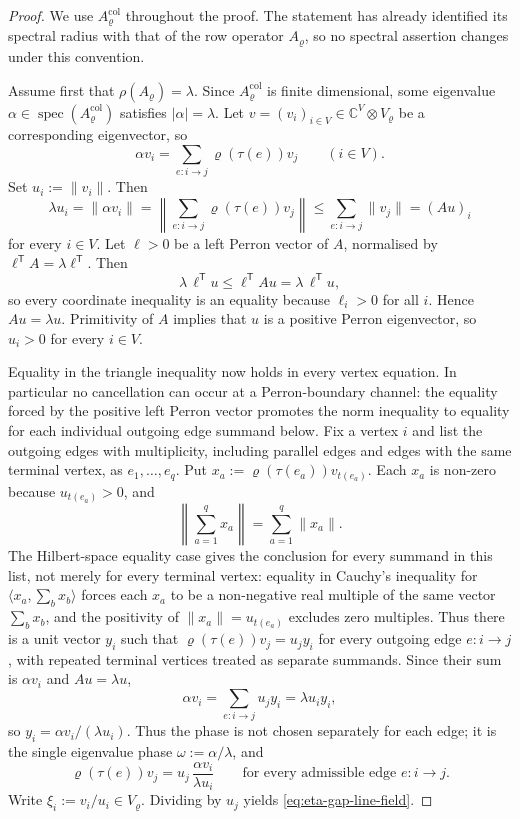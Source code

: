 \documentclass[11pt,a4paper]{amsart}
\theoremstyle{plain}
\theoremstyle{definition}
\theoremstyle{remark}
\DeclareMathOperator{\spec}{spec}
\newcommand{\CC}{\mathbb{C}}
\newcommand{\norm}[1]{\lVert #1 \rVert}
\begin{document}
\begin{proof}
  We use \(A_\varrho^{\mathrm{col}}\) throughout the proof. The statement
  has already identified its spectral radius with that of the row
  operator \(A_\varrho\), so no spectral assertion changes under this
  convention.

  Assume first that \(\rho(A_\varrho)=\lambda\). Since
  \(A_\varrho^{\mathrm{col}}\) is finite dimensional, some eigenvalue
  \(\alpha\in\spec(A_\varrho^{\mathrm{col}})\) satisfies
  \(|\alpha|=\lambda\). Let
  \(v=(v_i)_{i\in V}\in \CC^V\otimes V_\varrho\) be a corresponding
  eigenvector, so
  \[
    \alpha v_i=\sum_{e:i\to j}\varrho(\tau(e))v_j
    \qquad (i\in V).
  \]
  Set \(u_i:=\norm{v_i}\). Then
  \[
    \lambda u_i
    =
    \norm{\alpha v_i}
    =
    \left\|\sum_{e:i\to j}\varrho(\tau(e))v_j\right\|
    \le
    \sum_{e:i\to j}\norm{v_j}
    =(Au)_i
  \]
  for every \(i\in V\). Let \(\ell>0\) be a left Perron vector of
  \(A\), normalised by \(\ell^{\mathsf T}A=\lambda\ell^{\mathsf T}\).
  Then
  \[
    \lambda\,\ell^{\mathsf T}u
    \le
    \ell^{\mathsf T}Au
    =
    \lambda\,\ell^{\mathsf T}u,
  \]
  so every coordinate inequality is an equality because \(\ell_i>0\)
  for all \(i\). Hence \(Au=\lambda u\). Primitivity of \(A\) implies
  that \(u\) is a positive Perron eigenvector, so \(u_i>0\) for every
  \(i\in V\).

  Equality in the triangle inequality now holds in every vertex equation.
  In particular no cancellation can occur at a Perron-boundary channel: the
  equality forced by the positive left Perron vector promotes the norm
  inequality to equality for each individual outgoing edge summand below.
  Fix a vertex \(i\) and list the outgoing edges with multiplicity, including
  parallel edges and edges with the same terminal vertex, as
  \(e_1,
  \ldots,e_q\).  Put
  \(x_a:=\varrho(\tau(e_a))v_{t(e_a)}\).  Each \(x_a\) is non-zero because
  \(u_{t(e_a)}>0\), and
  \[
    \left\|\sum_{a=1}^q x_a\right\|=
    \sum_{a=1}^q\|x_a\| .
  \]
  The Hilbert-space equality case gives the conclusion for every summand in
  this list, not merely for every terminal vertex: equality in Cauchy's
  inequality for
  \(\langle x_a,\sum_bx_b\rangle\) forces each \(x_a\) to be a non-negative
  real multiple of the same vector \(\sum_bx_b\), and the positivity of
  \(\|x_a\|=u_{t(e_a)}\) excludes zero multiples.  Thus there is a unit
  vector \(y_i\) such that
  \(\varrho(\tau(e))v_j=u_jy_i\) for every outgoing edge \(e:i\to j\), with
  repeated terminal vertices treated as separate summands. Since their sum is
  \(\alpha v_i\) and \(Au=\lambda u\),
  \[
    \alpha v_i
    =\sum_{e:i\to j}u_jy_i
    =\lambda u_i y_i,
  \]
  so \(y_i=\alpha v_i/(\lambda u_i)\).  Thus the phase is not chosen
  separately for each edge; it is the single eigenvalue phase
  \(\omega:=\alpha/\lambda\), and
  \[
    \varrho(\tau(e))v_j
    =
    u_j\,\frac{\alpha v_i}{\lambda u_i}
    \qquad
    \text{for every admissible edge } e:i\to j.
  \]
  Write \(\xi_i:=v_i/u_i\in V_\varrho\). Dividing by \(u_j\) yields
  \eqref{eq:eta-gap-line-field}.


\end{proof}
\end{document}

